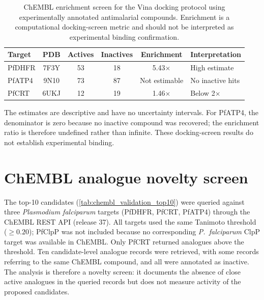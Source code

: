 \documentclass[11pt,a4paper]{article}
\begin{document}
\begin{table}[htbp]
\centering
\caption{ChEMBL enrichment screen for the Vina docking protocol using experimentally annotated antimalarial compounds. Enrichment is a computational docking-screen metric and should not be interpreted as experimental binding confirmation.}
\label{tab:chembl_enrichment}
\begin{tabularx}{\textwidth}{l c c c c l}
\toprule
Target & PDB & {Actives} & {Inactives} & {Enrichment} & Interpretation \\
\midrule
PfDHFR & 7F3Y & 53 & 18 & 5.43$\times$ & High estimate \\
PfATP4 & 9N10 & 73 & 87 & Not estimable & No inactive hits \\
PfCRT & 6UKJ & 12 & 19 & 1.46$\times$ & Below 2$\times$ \\
\bottomrule
\end{tabularx}
\vspace{1mm}
\footnotesize The estimates are descriptive and have no uncertainty intervals. For PfATP4, the denominator is zero because no inactive compound was recovered; the enrichment ratio is therefore undefined rather than infinite. These docking-screen results do not establish experimental binding.
\end{table}




\section{ChEMBL analogue novelty screen}
\label{sec:chembl_validation}

The top-10 candidates (\cref{tab:chembl_validation_top10}) were queried against three \textit{Plasmodium falciparum} targets (PfDHFR, PfCRT, PfATP4) through the ChEMBL REST API (release 37). All targets used the same Tanimoto threshold ($\geq 0.20$); PfClpP was not included because no corresponding \textit{P.~falciparum} ClpP target was available in ChEMBL. Only PfCRT returned analogues above the threshold. Ten candidate-level analogue records were retrieved, with some records referring to the same ChEMBL compound, and all were annotated as inactive. The analysis is therefore a novelty screen: it documents the absence of close active analogues in the queried records but does not measure activity of the proposed candidates.
\end{document}
